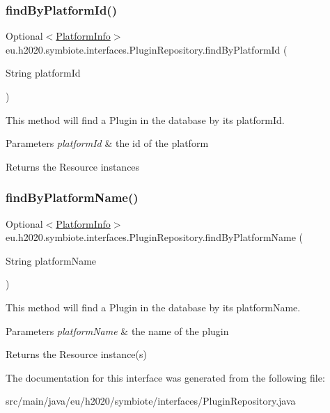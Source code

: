 \subsubsection{\texorpdfstring{find\+By\+Platform\+Id()}{findByPlatformId()}}
{\footnotesize\ttfamily Optional$<$\hyperlink{classeu_1_1h2020_1_1symbiote_1_1resources_1_1PlatformInfo}{Platform\+Info}$>$ eu.\+h2020.\+symbiote.\+interfaces.\+Plugin\+Repository.\+find\+By\+Platform\+Id (\begin{DoxyParamCaption}\item[{String}]{platform\+Id }\end{DoxyParamCaption})}

This method will find a Plugin in the database by its platform\+Id.


\begin{DoxyParams}{Parameters}
{\em platform\+Id} & the id of the platform \\
\hline
\end{DoxyParams}
\begin{DoxyReturn}{Returns}
the Resource instances 
\end{DoxyReturn}
\mbox{\label{interfaceeu_1_1h2020_1_1symbiote_1_1interfaces_1_1PluginRepository_a298cbb233c2115c00bb7053d8ad09af5}} 
\subsubsection{\texorpdfstring{find\+By\+Platform\+Name()}{findByPlatformName()}}
{\footnotesize\ttfamily Optional$<$\hyperlink{classeu_1_1h2020_1_1symbiote_1_1resources_1_1PlatformInfo}{Platform\+Info}$>$ eu.\+h2020.\+symbiote.\+interfaces.\+Plugin\+Repository.\+find\+By\+Platform\+Name (\begin{DoxyParamCaption}\item[{String}]{platform\+Name }\end{DoxyParamCaption})}

This method will find a Plugin in the database by its platform\+Name.


\begin{DoxyParams}{Parameters}
{\em platform\+Name} & the name of the plugin \\
\hline
\end{DoxyParams}
\begin{DoxyReturn}{Returns}
the Resource instance(s) 
\end{DoxyReturn}


The documentation for this interface was generated from the following file\+:\begin{DoxyCompactItemize}
\item 
src/main/java/eu/h2020/symbiote/interfaces/Plugin\+Repository.\+java\end{DoxyCompactItemize}
